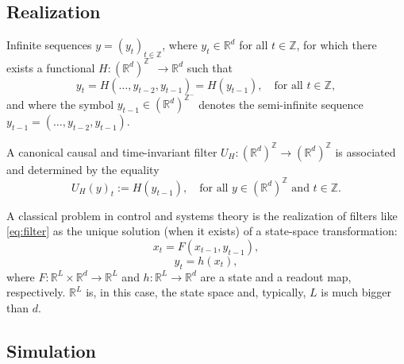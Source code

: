 \documentclass{article}
\theoremstyle{definition} \newtheorem{definition}{Definition}
\theoremstyle{remark} \newtheorem{remark}{Remark}
\newcounter{ct}
\begin{document}


\subsection{Realization}\label{sec:realization}
Infinite sequences \( y = (y_t)_{t \in \mathbb{Z}} \), where \( y_t \in \mathbb{R}^d \) for all \( t \in \mathbb{Z} \), for which there exists a functional \( H : (\mathbb{R}^d)^{\mathbb{Z}^-} \rightarrow \mathbb{R}^d \) such that 
\begin{equation}\label{eq:filter}
y_t = H(\ldots, y_{t-2}, y_{t-1}) = H\left( y_{t-1} \right), \quad \text{for all } t \in \mathbb{Z},
\end{equation}
and where the symbol \( y_{t-1} \in (\mathbb{R}^d)^{\mathbb{Z}^-} \) denotes the semi-infinite sequence \( y_{t-1} = (\ldots, y_{t-2}, y_{t-1}) \).

A canonical causal and time-invariant filter \( U_H : (\mathbb{R}^d)^{\mathbb{Z}} \rightarrow (\mathbb{R}^d)^{\mathbb{Z}} \) is associated and determined by the equality 
\[
U_H(y)_t := H\left( y_{t-1} \right), \quad \text{for all } y \in (\mathbb{R}^d)^{\mathbb{Z}} \text{ and } t \in \mathbb{Z}.
\]

A classical problem in control and systems theory is the realization of filters like \ref{eq:filter} as the unique solution (when it exists) of a state-space transformation:
\begin{equation}
x_t = F(x_{t-1}, y_{t-1}),
\end{equation}
\begin{equation}
y_t = h(x_t),
\end{equation}
where \( F : \mathbb{R}^L \times \mathbb{R}^d \rightarrow \mathbb{R}^L \) and \( h : \mathbb{R}^L \rightarrow \mathbb{R}^d \) are a state and a readout map, respectively. \( \mathbb{R}^L \) is, in this case, the state space and, typically, \( L \) is much bigger than \( d \).


\subsection{Simulation}\label{sec:simulation}
\citep{sontag1992neural}
\end{document}
